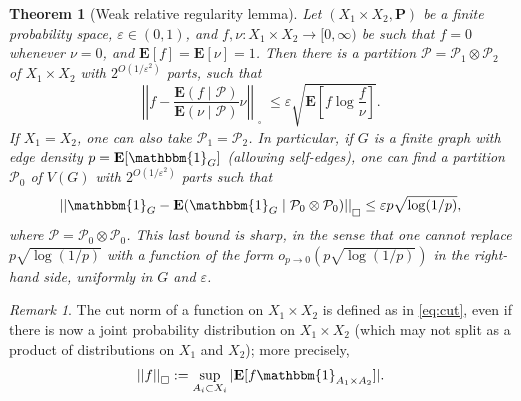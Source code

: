\documentclass[reqno,11pt]{amsart}
\newtheorem{theorem}{Theorem}[section]
\theoremstyle{definition}
\theoremstyle{remark}
\newtheorem*{remark}{Remark}
\numberwithin{equation}{section}
\renewcommand{\P}{\mathbf{P}}
\newcommand{\E}{\mathbf{E}}
\newcommand{\mP}{\mathcal{P}}
\newcommand{\one}{\mathbbm{1}}
\newcommand{\eps}{\varepsilon}
\newcommand{\sq}{_{\substack{ \\ \square}}}
\begin{document}
\begin{theorem}[Weak relative regularity lemma] \label{thm:weak-relative-regularity}
Let $(X_1 \times X_2, \P)$ be a finite probability space, $\eps \in (0, 1)$, and $f, \nu : X_1 \times X_2 \to [0, \infty)$ be such that $f = 0$ whenever $\nu = 0$, and $\E[f] = \E[\nu] = 1$. Then there is a partition $\mP = \mP_1 \otimes \mP_2$ of $X_1 \times X_2$ with $2^{O(1/\eps^2)}$ parts, such that
\[
    \left\vert \left\vert f - \frac{\E(f \mid \mP)}{\E(\nu \mid \mP)}\nu\right\vert\right\vert\sq \le \eps \sqrt{\E\left[f \log \frac{f}{\nu}\right]}.
\]
If $X_1 = X_2$, one can also take $\mP_1 = \mP_2$. In particular, if $G$ is a finite graph with edge density $p = \E[\one_G]$ (allowing self-edges), one can find a partition $\mP_0$ of $V(G)$ with $2^{O(1/\eps^2)}$ parts such that
\[
    \left\vert\left\vert \one_{G} - \E(\one_{G} \mid \mP_0 \otimes \mP_0)\right\vert\right\vert\sq \le \eps p \sqrt{\log(1/p)},
\]
where $\mP = \mP_0 \otimes \mP_0$. This last bound is sharp, in the sense that one cannot replace $p \sqrt{\log(1/p)}$ with a function of the form $o_{p \to 0}(p \sqrt{\log(1/p)})$ in the right-hand side, uniformly in $G$ and $\eps$.
\end{theorem}

\begin{remark}
The cut norm of a function on $X_1 \times X_2$ is defined as in \cref{eq:cut}, even if there is now a joint probability distribution on $X_1 \times X_2$ (which may not split as a product of distributions on $X_1$ and $X_2$); more precisely,
\[
    ||f||\sq := \sup_{A_i \subset X_i}
    |\E[f \one_{A_1 \times A_2}]|.
\]
\end{remark}

\end{document}
